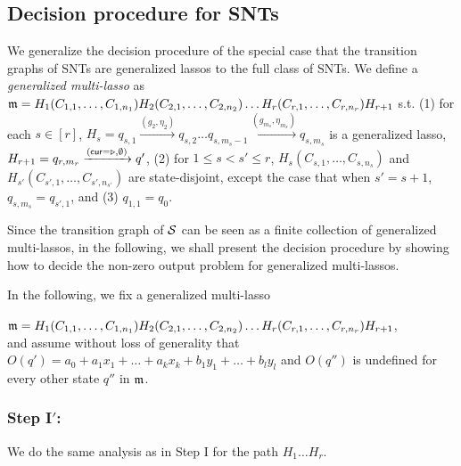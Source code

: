 
\subsection{Decision procedure for SNTs}\label{sec-gflat}

We generalize the decision procedure of the special case that the transition graphs of SNTs are generalized lassos to the full class of SNTs.
We  define a \emph{generalized multi-lasso} as $\mathfrak{m}= H_1 (C_{1,1},\dots,C_{1,n_1}) H_2 (C_{2,1},\dots,C_{2,n_2}) \dots H_r (C_{r,1},\dots, C_{r, n_r}) H_{r+1}$ s.t. (1) for each $s\in [r]$, $H_s=q_{s,1} \xrightarrow{(g_2,\eta_2)} q_{s,2} \dots q_{s,m_s-1} \xrightarrow{(g_{m_s},\eta_{m_s})} q_{s,m_s}$ is a generalized lasso, $H_{r+1} = q_{r, m_r} \xrightarrow{(\mathsf{cur} = \triangleright, \emptyset)} q'$, (2) for $1 \leq s< s' \leq r$, $H_s (C_{s,1},\dots,C_{s, n_s})$ and $H_{s'} (C_{s', 1},\dots,C_{s', n_{s'}})$ are state-disjoint, except the case that when $s'=s+1$, $q_{s, m_s}=q_{s',1}$, and (3) $q_{1,1}=q_0$.

Since the transition graph of ${\mathcal{S} }$ can be seen as a finite collection of generalized multi-lassos, in the following, we shall present the decision procedure by showing how to decide the non-zero output problem for generalized multi-lassos. 

In the following, we fix a generalized multi-lasso 

\smallskip
\hspace{2mm} $\mathfrak{m}= H_1 (C_{1,1},\dots,C_{1,n_1}) H_2 (C_{2,1},\dots,C_{2,n_2}) \dots H_r (C_{r,1},\dots, C_{r, n_r}) H_{r+1}$,\\
\smallskip
 and assume without loss of generality that $O(q')=a_0+a_1 x_1 + \dots + a_k x_k + b_1 y_1  + \dots + b_l y_l$ and $O(q'')$ is undefined for every other state $q''$ in $\mathfrak{m}$.

\vspace{-2mm}

\subsubsection{Step I$'$:} We do the same analysis as in Step I for the path $H_1\dots H_r$.


